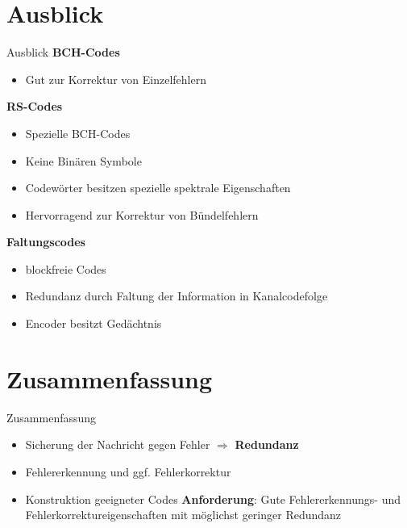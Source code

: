 \documentclass[ngerman]{beamer}
\begin{document}
\section{Ausblick}
\begin{frame}{Ausblick}
\textbf{BCH-Codes}
	\begin{itemize}
		\item Gut zur Korrektur von \alert{Einzelfehlern}
	\end{itemize}

	\textbf{RS-Codes}
	\begin{itemize}
	\item  Spezielle BCH-Codes
  	\item Keine Binären Symbole
  	\item Codewörter besitzen spezielle \alert{spektrale} Eigenschaften
  	\item Hervorragend zur Korrektur von \alert{Bündelfehlern}

	\end{itemize}



	\textbf{Faltungscodes}
	\begin{itemize}
		\item blockfreie Codes
		\item Redundanz durch Faltung der Information in Kanalcodefolge
		\item Encoder besitzt \alert{Gedächtnis}
	\end{itemize}
\end{frame}



\section{Zusammenfassung}
\begin{frame}{Zusammenfassung}

	\begin{itemize}

		\item Sicherung der Nachricht gegen Fehler\newline
		 $\Rightarrow$ \textbf{\alert{Redundanz}}\newline
		\item \alert{Fehlererkennung} und ggf. \alert{Fehlerkorrektur}\newline
		\item Konstruktion geeigneter Codes\newline\newline
		\textbf{Anforderung}: Gute Fehlererkennungs- und Fehlerkorrektureigenschaften mit
möglichst geringer Redundanz\newline
	\end{itemize}

\end{frame}
\end{document}
